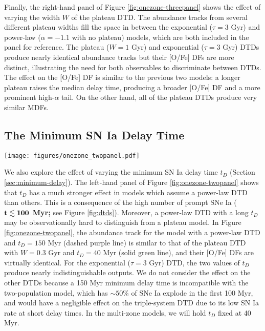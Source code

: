 \documentclass[twocolumn,twocolappendix,linenumbers]{aastex631}
\begin{document}
Finally, the right-hand panel of Figure \ref{fig:onezone-threepanel} shows the effect of varying the width $W$ of the plateau DTD. The abundance tracks from several different plateau widths fill the space in between the exponential ($\tau=3$ Gyr) and power-law ($\alpha=-1.1$ with no plateau) models, which are both included in the panel for reference. The plateau ($W=1$ Gyr) and exponential ($\tau=3$ Gyr) DTDs produce nearly identical abundance tracks but their [O/Fe] DFs are more distinct, illustrating the need for both observables to discriminate between DTDs. The effect on the [O/Fe] DF is similar to the previous two models: a longer plateau raises the median delay time, producing a broader [O/Fe] DF and a more prominent high-$\alpha$ tail. On the other hand, all of the plateau DTDs produce very similar MDFs.

\subsection{\bf The Minimum SN Ia Delay Time}
\label{sec:onezone-minimum-delay}

\begin{figure*}
    \centering
    \texttt{[image: figures/onezone\_twopanel.pdf]}
    \caption{\textit{Left:} Comparison of one-zone models with different combinations of minimum delay time $t_D$ and DTD shape.
    The layout is similar to Figure \ref{fig:onezone-threepanel}. For visual clarity, we assume a mass-loading factor $\eta=1$ for the exponential DTD curves, which places the end-point of the abundance tracks at higher [Fe/H].
    \textit{Right:} Comparison of one-zone models with five different DTD models (see Figure \ref{fig:dtds}).
    }
    \label{fig:onezone-twopanel}
\end{figure*}

We also explore the effect of varying the minimum SN Ia delay time $t_D$ (Section \ref{sec:minimum-delay}).
The left-hand panel of Figure \ref{fig:onezone-twopanel} shows that $t_D$ has a much stronger effect in models which assume a power-law DTD than others. This is a consequence of the high number of prompt SNe Ia ({\bf $\bf t\lesssim100$ Myr;} see Figure \ref{fig:dtds}). Moreover, a power-law DTD with a long $t_D$ may be observationally hard to distinguish from a plateau model. In Figure \ref{fig:onezone-twopanel}, the abundance track for the model with a power-law DTD and $t_D=150$ Myr (dashed purple line) is similar to that of the plateau DTD with $W=0.3$ Gyr and $t_D=40$ Myr (solid green line), and their [O/Fe] DFs are virtually identical. For the exponential ($\tau=3$ Gyr) DTD, the two values of $t_D$ produce nearly indistinguishable outputs. We do not consider the effect on the other DTDs because a 150 Myr minimum delay time is incompatible with the two-population model, which has $\sim 50$\% of SNe Ia explode in the first 100 Myr, and would have a negligible effect on the triple-system DTD due to its low SN Ia rate at short delay times.
In the multi-zone models, we will hold $t_D$ fixed at 40 Myr.
\end{document}
